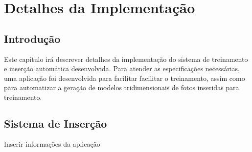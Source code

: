 \chapter{Detalhes da Implementação}

\section{Introdução}

Este capítulo irá descrever detalhes da implementação do sistema de treinamento e inserção automática desenvolvida. Para atender as especificações necessárias, uma aplicação foi desenvolvida para facilitar facilitar o treinamento, assim como para automatizar a geração de modelos tridimensionais de fotos inseridas para treinamento.

\section{Sistema de Inserção}
\label{sec:sistema-imersao}

Inserir informações da aplicação
